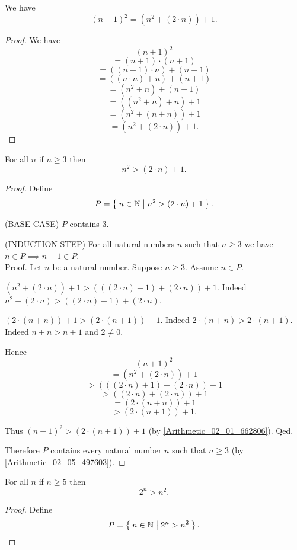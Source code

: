 \documentclass[../../arithmetic.ftl.tex]{subfiles}
\begin{document}
  \begin{forthel}
    \begin{proposition}\label{Arithmetic_02_06_276270}
      We have \[ (n + 1)^{2} = (n^{2} + (2 \cdot n)) + 1. \]
    \end{proposition}
    \begin{proof}
      We have
      \[   (n + 1)^{2} \]
      \[ = (n + 1) \cdot (n + 1) \]
      \[ = ((n + 1) \cdot n) + (n + 1) \]
      \[ = ((n \cdot n) + n) + (n + 1) \]
      \[ = (n^{2} + n) + (n + 1) \]
      \[ = ((n^{2} + n) + n) + 1 \]
      \[ = (n^{2} + (n + n)) + 1 \]
      \[ = (n^{2} + (2 \cdot n)) + 1. \]
    \end{proof}


    \begin{proposition}\label{Arithmetic_02_06_671464}
      For all $n$ if $n \geq 3$ then \[ n^{2} > (2 \cdot n) + 1. \]
    \end{proposition}
    \begin{proof}
      Define \[ P = \Set{n \in \mathbb{N} | n^{2} > (2 \cdot n) + 1}. \]

      (BASE CASE) $P$ contains $3$.

      (INDUCTION STEP) For all natural numbers $n$ such that $n \geq 3$ we have $n \in P \implies n + 1 \in P$. \\
      Proof.
        Let $n$ be a natural number.
        Suppose $n \geq 3$.
        Assume $n \in P$.

        $(n^{2} + (2 \cdot n)) + 1 > (((2 \cdot n) + 1) + (2 \cdot n)) + 1$.
        Indeed $n^{2} + (2 \cdot n) > ((2 \cdot n) + 1) + (2 \cdot n)$.

        $(2 \cdot (n + n)) + 1 > (2 \cdot (n + 1)) + 1$.
        Indeed $2 \cdot (n + n) > 2 \cdot (n + 1)$.
        Indeed $n + n > n + 1$ and $2 \neq 0$.

        Hence
        \[   (n + 1)^{2} \]
        \[ = (n^{2} + (2 \cdot n)) + 1 \]
        \[ > (((2 \cdot n) + 1) + (2 \cdot n)) + 1 \]
        \[ > ((2 \cdot n) + (2 \cdot n)) + 1 \]
        \[ = (2 \cdot (n + n)) + 1 \]
        \[ > (2 \cdot (n + 1)) + 1. \]

        Thus $(n + 1)^{2} > (2 \cdot (n + 1)) + 1$ (by \ref{Arithmetic_02_01_662806}).
      Qed.

      Therefore $P$ contains every natural number $n$ such that $n \geq 3$ (by \ref{Arithmetic_02_05_497603}).
    \end{proof}


    \begin{proposition}\label{Arithmetic_02_06_205395}
      For all $n$ if $n \geq 5$ then \[ 2^{n} > n^{2}. \]
    \end{proposition}
    \begin{proof}
      Define \[ P = \Set{n \in \mathbb{N} | 2^{n} > n^{2}}. \]


\end{proof}
\end{forthel}
\end{document}
